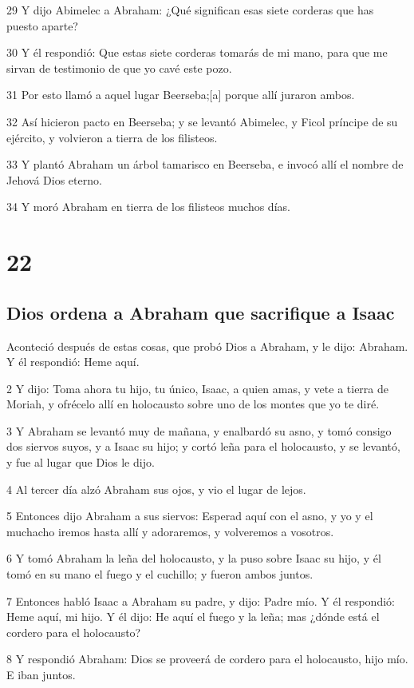 29 Y dijo Abimelec a Abraham: ¿Qué significan esas siete corderas que has puesto aparte?

30 Y él respondió: Que estas siete corderas tomarás de mi mano, para que me sirvan de testimonio de que yo cavé este pozo.

31 Por esto llamó a aquel lugar Beerseba;[a] porque allí juraron ambos.

32 Así hicieron pacto en Beerseba; y se levantó Abimelec, y Ficol príncipe de su ejército, y volvieron a tierra de los filisteos.

33 Y plantó Abraham un árbol tamarisco en Beerseba, e invocó allí el nombre de Jehová Dios eterno.

34 Y moró Abraham en tierra de los filisteos muchos días.

\chapter{22}

\section{Dios ordena a Abraham que sacrifique a Isaac}

Aconteció después de estas cosas, que probó Dios a Abraham, y le dijo: Abraham. Y él respondió: Heme aquí.

2 Y dijo: Toma ahora tu hijo, tu único, Isaac, a quien amas, y vete a tierra de Moriah, y ofrécelo allí en holocausto sobre uno de los montes que yo te diré.

3 Y Abraham se levantó muy de mañana, y enalbardó su asno, y tomó consigo dos siervos suyos, y a Isaac su hijo; y cortó leña para el holocausto, y se levantó, y fue al lugar que Dios le dijo.

4 Al tercer día alzó Abraham sus ojos, y vio el lugar de lejos.

5 Entonces dijo Abraham a sus siervos: Esperad aquí con el asno, y yo y el muchacho iremos hasta allí y adoraremos, y volveremos a vosotros.

6 Y tomó Abraham la leña del holocausto, y la puso sobre Isaac su hijo, y él tomó en su mano el fuego y el cuchillo; y fueron ambos juntos.

7 Entonces habló Isaac a Abraham su padre, y dijo: Padre mío. Y él respondió: Heme aquí, mi hijo. Y él dijo: He aquí el fuego y la leña; mas ¿dónde está el cordero para el holocausto?

8 Y respondió Abraham: Dios se proveerá de cordero para el holocausto, hijo mío. E iban juntos.

